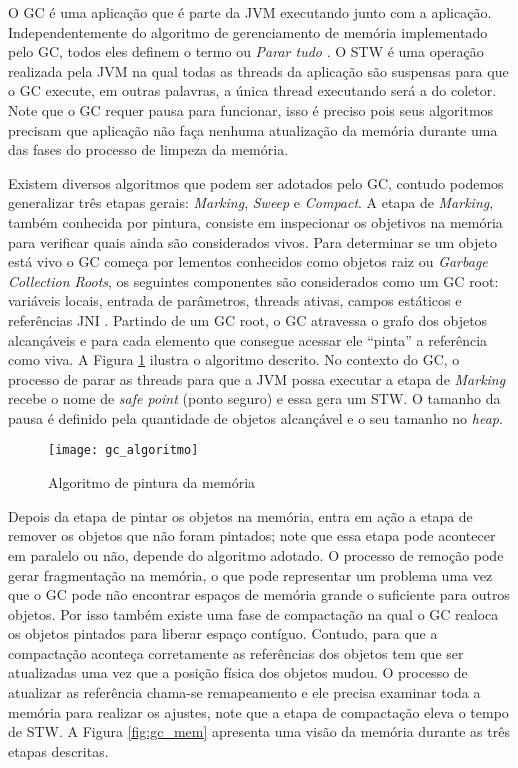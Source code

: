 O GC é uma aplicação que é parte da JVM executando junto com a aplicação.
Independentemente do algoritmo de gerenciamento de memória implementado pelo
GC, todos eles definem o termo  ou
\textit{Parar tudo} \citep{gc_pauseless}. O STW é uma operação realizada pela
JVM  na qual todas as threads da aplicação são suspensas para que o GC execute,
em outras palavras, a única thread executando será a do coletor. Note que o GC
requer pausa para funcionar, isso é preciso pois seus algoritmos precisam que
aplicação não faça nenhuma atualização da memória durante uma das fases do
processo de limpeza da memória.

Existem diversos algoritmos que podem ser adotados pelo GC, contudo podemos
generalizar três etapas gerais: \textit{Marking}, \textit{Sweep} e
\textit{Compact}. A etapa de \textit{Marking}, também conhecida por pintura,
consiste em inspecionar os objetivos na memória para verificar quais ainda são
considerados vivos. Para determinar se um objeto está vivo o GC começa por
lementos conhecidos como objetos raiz ou \textit{Garbage Collection Roots}, os
seguintes componentes são considerados como um GC root: variáveis locais,
entrada de parâmetros, threads ativas, campos estáticos e referências JNI
\citep{gc_basics}. Partindo de um GC root, o GC atravessa o grafo dos objetos
alcançáveis e para cada elemento que consegue acessar ele “pinta” a referência
como viva. A Figura \ref{fig:gc_alg} ilustra o algoritmo descrito. No contexto
do GC, o processo de parar as threads para que a JVM possa executar a etapa de
\textit{Marking} recebe o nome de \textit{safe point} (ponto seguro) e essa
gera um STW. O tamanho da pausa é definido pela quantidade de objetos
alcançável e o seu tamanho no \textit{heap}.

\begin{figure}[!h]
  \centering
  \texttt{[image: gc\_algoritmo]}
  \caption{Algoritmo de pintura da memória\citep{gc_basics}}
  \label{fig:gc_alg}
\end{figure}

Depois da etapa de pintar os objetos na memória, entra em ação a etapa de
remover os objetos que não foram pintados; note que essa etapa pode acontecer
em paralelo ou não, depende do algoritmo adotado. O processo de remoção pode
gerar fragmentação na memória, o que pode representar um problema uma vez que o
GC pode não encontrar espaços de memória grande o suficiente para outros
objetos. Por isso também existe uma fase de compactação na qual o GC realoca os
objetos pintados para liberar espaço contíguo. Contudo, para que a compactação
aconteça corretamente as referências dos objetos tem que ser atualizadas uma
vez que a posição física dos objetos mudou. O processo de atualizar as
referência chama-se remapeamento e ele precisa examinar toda a memória para
realizar os ajustes, note que a etapa de compactação eleva o tempo de STW. A
Figura \ref{fig:gc_mem} apresenta uma visão da memória durante as três etapas
descritas.

